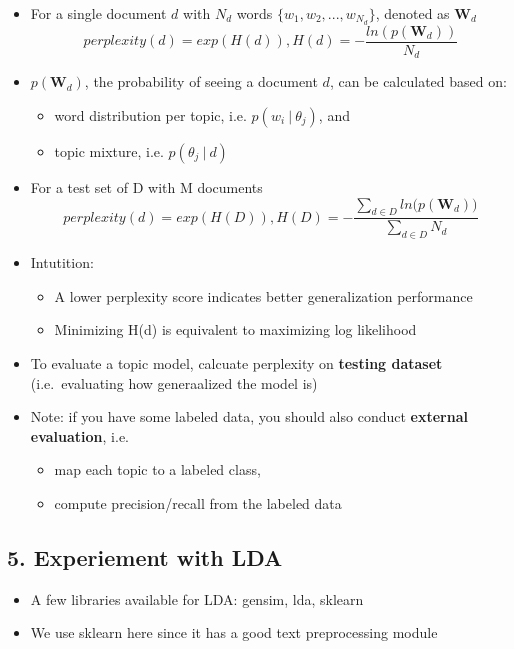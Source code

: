 \documentclass[11pt]{article}
\providecommand{\tightlist}{%
      \setlength{\itemsep}{0pt}\setlength{\parskip}{0pt}}
\begin{document}
\begin{itemize}
\tightlist
\item
  For a single document \(d\) with \(N_d\) words
  \(\{w_1, w_2, ..., w_{N_d}\}\), denoted as \(\textbf{W}_d\) \[
  perplexity(d)= exp({H(d)}),  
  H(d) = - \frac{ln (p(\textbf{W}_d))}{N_d}  
  \]
\item
  \(p(\textbf{W}_d)\), the probability of seeing a document \(d\), can
  be calculated based on:

  \begin{itemize}
  \tightlist
  \item
    word distribution per topic, i.e. \(p(w_i~|~\theta_j)\), and
  \item
    topic mixture, i.e. \(p(\theta_j~|~d)\)
  \end{itemize}
\item
  For a test set of D with M documents
  \[ perplexity(d)= exp({H(D)}), H(D) = - \frac{\sum_{d \in D} {ln   (p(\textbf{W}_d)})}{\sum_{d \in D}{N_d}} \]
\item
  Intutition:

  \begin{itemize}
  \tightlist
  \item
    A lower perplexity score indicates better generalization performance
  \item
    Minimizing H(d) is equivalent to maximizing log likelihood
  \end{itemize}
\item
  To evaluate a topic model, calcuate perplexity on \textbf{testing
  dataset} (i.e.~evaluating how generaalized the model is)
\item
  Note: if you have some labeled data, you should also conduct
  \textbf{external evaluation}, i.e.

  \begin{itemize}
  \tightlist
  \item
    map each topic to a labeled class,
  \item
    compute precision/recall from the labeled data
  \end{itemize}
\end{itemize}

    \hypertarget{experiement-with-lda}{%
\subsection{5. Experiement with LDA}\label{experiement-with-lda}}

\begin{itemize}
\tightlist
\item
  A few libraries available for LDA: gensim, lda, sklearn
\item
  We use sklearn here since it has a good text preprocessing module
\end{itemize}
\end{document}
